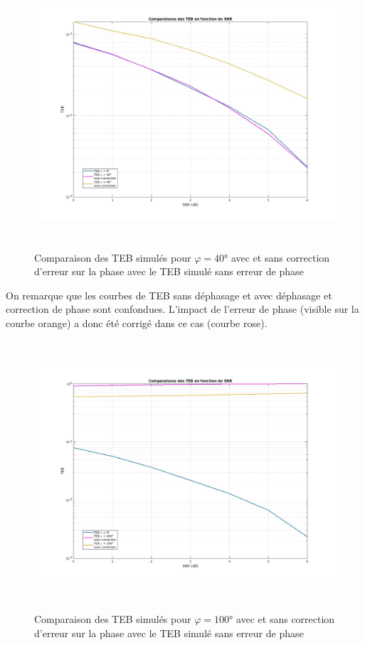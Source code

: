 \documentclass[11pt,a4paper]{report}
\begin{document}
\begin{figure}[H]
    \centering
    \includegraphics[height=10cm]{Screenshots/3_2_1.jpg}
    \caption{Comparaison des TEB simulés pour $\varphi = 40$° avec et sans correction d'erreur sur la phase avec le TEB simulé sans erreur de phase}
    \label{fig:un_label} 
\end{figure}

On remarque que les courbes de TEB sans déphasage et avec déphasage et correction de phase sont confondues. L'impact de l'erreur de phase (visible sur la courbe orange) a donc été corrigé dans ce cas (courbe rose).

\begin{figure}[H]
    \centering
    \includegraphics[height=10cm]{Screenshots/3_2_2.jpg}
    \caption{Comparaison des TEB simulés pour $\varphi = 100$° avec et sans correction d'erreur sur la phase avec le TEB simulé sans erreur de phase}
    \label{fig:un_label} 
\end{figure}
\end{document}
